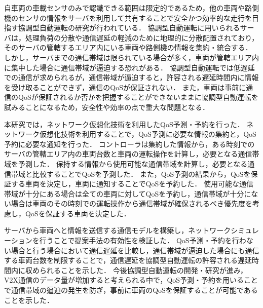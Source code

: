 \documentclass[a4paper,11pt,uplatex]{ujreport}
\begin{document}
  自車両の車載センサのみで認識できる範囲は限定的であるため，他の車両や路側機のセンサの情報をサーバを利用して共有することで安全かつ効率的な走行を目指す協調型自動運転の研究が行われている．
  協調型自動運転に用いられるサーバは，処理負荷の分散や通信遅延の軽減のために地理的に分散配置されており，そのサーバの管轄するエリア内にいる車両や路側機の情報を集約・統合する．
  しかし，サーバまでの通信帯域は限られている場合が多く，車両が管轄エリア内に集中した場合に通信帯域が逼迫する恐れがある．
  協調型自動運転では低遅延での通信が求められるが，通信帯域が逼迫すると，許容される遅延時間内に情報を受け取ることができず，通信のQoSが保証されない．
  また，車両は事前に通信のQoSが保証されるか否かを把握することができないままに協調型自動運転を試みることになるため，安全性や効率の点で重大な問題となる．\par
  本研究では，ネットワーク仮想化技術を利用したQoS予測・予約を行った．
  ネットワーク仮想化技術を利用することで，QoS予測に必要な情報の集約と，QoS予約に必要な通知を行った．
  コントローラは集約した情報から，ある時刻でのサーバの管轄エリア内の車両台数と車両の運転操作を計算し，必要となる通信帯域を予測した．
  保持する情報から使用可能な通信帯域を計算し，必要となる通信帯域と比較することでQoSを予測した．
  また，QoS予測の結果から，QoSを保証する車両を決定し，車両に通知することでQoSを予約した．
  使用可能な通信帯域が十分にある場合は全ての車両に対してQoSを予約し，通信帯域が十分にない場合は車両のその時刻での運転操作から通信帯域が確保されるべき優先度を考慮し，QoSを保証する車両を決定した．\par
  サーバから車両へと情報を送信する通信モデルを構築し，ネットワークシミュレーションを行うことで提案手法の有効性を検証した．
  QoS予測・予約を行わない場合と行う場合において通信遅延を比較し，通信帯域が逼迫した場合にも通信する車両台数を制限することで，通信遅延を協調型自動運転の許容される遅延時間内に収められることを示した．
  今後協調型自動運転の開発・研究が進み，V2X通信のデータ量が増加すると考えられる中で，QoS予測・予約を用いることで通信帯域の逼迫の発生を防ぎ，事前に車両のQoSを保証することが可能であることを示した．

\end{document}
